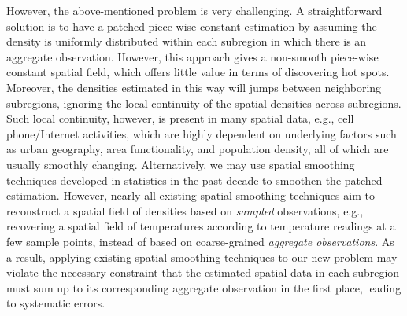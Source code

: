 However, the above-mentioned problem is very challenging. %
A straightforward solution is to have a patched piece-wise constant estimation by assuming the density is uniformly distributed within each subregion in which there is an aggregate observation. However, this approach gives a non-smooth piece-wise constant spatial field, which offers little value in terms of discovering hot spots. 
Moreover, the densities estimated in this way will jumps between neighboring subregions, ignoring the local continuity of the spatial densities across subregions. Such local continuity, however, is present in many spatial data, e.g., cell phone/Internet activities, which are highly dependent on underlying factors such as urban geography, area functionality, and population density, all of which are usually smoothly changing. 
Alternatively, we may use spatial smoothing techniques \cite{Sanga13} developed in statistics in the past decade to smoothen the patched estimation. 
However, nearly all existing spatial smoothing techniques \cite{Wood08, Sanga13, guillas2010bivariate} aim to reconstruct a spatial field of densities based on \emph{sampled} observations, e.g., recovering a spatial field of temperatures according to temperature readings at a few sample points, instead of based on coarse-grained \emph{aggregate observations}. As a result, applying existing spatial smoothing techniques to our new problem may violate the necessary constraint that the estimated spatial data in each subregion must sum up to its corresponding aggregate observation in the first place, leading to systematic errors.

